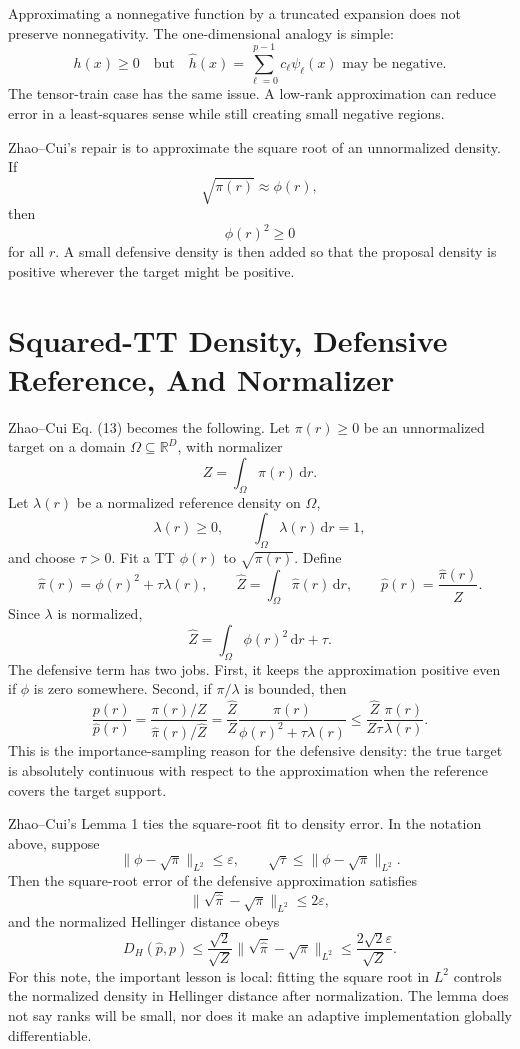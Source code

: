 \documentclass[11pt]{article}
\newcommand{\R}{\mathbb R}
\newcommand{\dd}{\,\mathrm d}
\begin{document}
Approximating a nonnegative function by a truncated expansion does not preserve
nonnegativity.  The one-dimensional analogy is simple:
\[
    h(x)\ge 0
    \quad\text{but}\quad
    \widehat h(x)=\sum_{\ell=0}^{p-1}c_\ell\psi_\ell(x)
    \text{ may be negative.}
\]
The tensor-train case has the same issue.  A low-rank approximation can reduce
error in a least-squares sense while still creating small negative regions.

Zhao--Cui's repair is to approximate the square root of an unnormalized density.
If
\[
    \sqrt{\pi(r)}\approx \phi(r),
\]
then
\[
    \phi(r)^2\ge 0
\]
for all \(r\).  A small defensive density is then added so that the proposal
density is positive wherever the target might be positive.

\section{Squared-TT Density, Defensive Reference, And Normalizer}

Zhao--Cui Eq. (13) becomes the following.  Let \(\pi(r)\ge0\) be an
unnormalized target on a domain \(\Omega\subseteq\R^D\), with normalizer
\[
    Z=\int_\Omega \pi(r)\dd r.
\]
Let \(\lambda(r)\) be a normalized reference density on \(\Omega\),
\[
    \lambda(r)\ge0,\qquad \int_\Omega \lambda(r)\dd r=1,
\]
and choose \(\tau>0\).  Fit a TT \(\phi(r)\) to \(\sqrt{\pi(r)}\).  Define
\[
    \widehat\pi(r)
    =
    \phi(r)^2+\tau\lambda(r),
    \qquad
    \widehat Z
    =
    \int_\Omega \widehat\pi(r)\dd r,
    \qquad
    \widehat p(r)
    =
    \frac{\widehat\pi(r)}{\widehat Z}.
    \tag{S1}
\]
Since \(\lambda\) is normalized,
\[
    \widehat Z
    =
    \int_\Omega \phi(r)^2\dd r+\tau.
    \tag{S2}
\]
The defensive term has two jobs.  First, it keeps the approximation positive
even if \(\phi\) is zero somewhere.  Second, if \(\pi/\lambda\) is bounded, then
\[
    \frac{p(r)}{\widehat p(r)}
    =
    \frac{\pi(r)/Z}{\widehat\pi(r)/\widehat Z}
    =
    \frac{\widehat Z}{Z}
    \frac{\pi(r)}{\phi(r)^2+\tau\lambda(r)}
    \le
    \frac{\widehat Z}{Z\tau}
    \frac{\pi(r)}{\lambda(r)}.
    \tag{S3}
\]
This is the importance-sampling reason for the defensive density: the true
target is absolutely continuous with respect to the approximation when the
reference covers the target support.

Zhao--Cui's Lemma 1 ties the square-root fit to density error.  In the notation
above, suppose
\[
    \|\phi-\sqrt{\pi}\|_{L^2}\le \varepsilon,
    \qquad
    \sqrt{\tau}\le \|\phi-\sqrt{\pi}\|_{L^2}.
    \tag{S4}
\]
Then the square-root error of the defensive approximation satisfies
\[
    \|\sqrt{\widehat\pi}-\sqrt{\pi}\|_{L^2}\le 2\varepsilon,
    \tag{S5}
\]
and the normalized Hellinger distance obeys
\[
    D_H(\widehat p,p)
    \le
    \frac{\sqrt{2}}{\sqrt Z}
    \|\sqrt{\widehat\pi}-\sqrt{\pi}\|_{L^2}
    \le
    \frac{2\sqrt{2}\varepsilon}{\sqrt Z}.
    \tag{S6}
\]
For this note, the important lesson is local: fitting the square root in
\(L^2\) controls the normalized density in Hellinger distance after
normalization.  The lemma does not say ranks will be small, nor does it make an
adaptive implementation globally differentiable.
\end{document}
